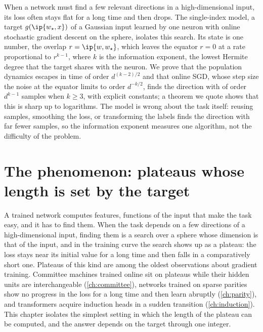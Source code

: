 \begin{refsection}

\begin{chaptersummary}
When a network must find a few relevant directions in a high-dimensional input, its loss often stays flat for a long time and then drops. The single-index model, a target $g(\ip{w_\star,x})$ of a Gaussian input learned by one neuron with online stochastic gradient descent on the sphere, isolates this search. Its state is one number, the overlap $r=\ip{w,w_\star}$, which leaves the equator $r=0$ at a rate proportional to $r^{k-1}$, where $k$ is the information exponent, the lowest Hermite degree that the target shares with the neuron. We prove that the population dynamics escapes in time of order $d^{(k-2)/2}$ and that online SGD, whose step size the noise at the equator limits to order $d^{-k/2}$, finds the direction with of order $d^{k-1}$ samples when $k\ge3$, with explicit constants; a theorem we quote shows that this is sharp up to logarithms. The model is wrong about the task itself: reusing samples, smoothing the loss, or transforming the labels finds the direction with far fewer samples, so the information exponent measures one algorithm, not the difficulty of the problem.
\end{chaptersummary}

\section{The phenomenon: plateaus whose length is set by the target}\label{sec:singleindex:phenomenon}

A trained network computes features, functions of the input that make the task easy, and it has to find them. When the task depends on a few directions of a high-dimensional input, finding them is a search over a sphere whose dimension is that of the input, and in the training curve the search shows up as a plateau: the loss stays near its initial value for a long time and then falls in a comparatively short one. Plateaus of this kind are among the oldest observations about gradient training. Committee machines trained online sit on plateaus while their hidden units are interchangeable (\cref{ch:committee}), networks trained on sparse parities show no progress in the loss for a long time and then learn abruptly (\cref{ch:parity}), and transformers acquire induction heads in a sudden transition (\cref{ch:induction}). This chapter isolates the simplest setting in which the length of the plateau can be computed, and the answer depends on the target through one integer.


\end{refsection}
